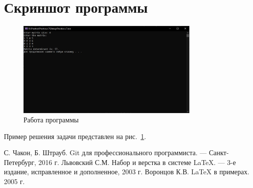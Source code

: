 \documentclass[12pt,a4paper]{scrartcl}
\begin{document}
\section{Скриншот программы}
\label{sec:picexample}
\begin{figure}[h]
	\centering
	\includegraphics[width=0.8\textwidth]{practice.jpg}
	\caption{Работа программы}\label{fig:pra}
\end{figure}

Пример решения задачи представлен на рис.~\ref{fig:pra}.

\begin{thebibliography}{9}
С. Чакон, Б. Штрауб. Git для профессионального программиста. \newblock --- Санкт-Петербург, 2016 г.
Львовский С.М. Набор и верстка в системе \LaTeX{}. \newblock --- 3-е издание, исправленное и дополненное, 2003 г.
Воронцов К.В. \LaTeX{} в примерах. 2005 г.
\end{thebibliography}
\end{document}
